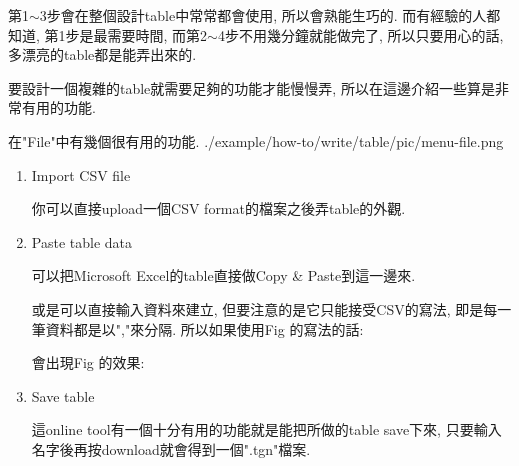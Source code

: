   第1$\sim$3步會在整個設計table中常常都會使用, 所以會熟能生巧的. 而有經驗的人都知道, 第1步是最需要時間, 而第2$\sim$4步不用幾分鐘就能做完了, 所以只要用心的話, 多漂亮的table都是能弄出來的.

\newpage
{}

要設計一個複雜的table就需要足夠的功能才能慢慢弄, 所以在這邊介紹一些算是非常有用的功能.


  在"File"中有幾個很有用的功能.
  \InsertFigure
    {./example/how-to/write/table/pic/menu-file.png}

  \begin{enumerate}

  \item
  {
    Import CSV file

    你可以直接upload一個CSV format的檔案之後弄table的外觀.
  } %

  \newpage
  \item
  {
    Paste table data

    可以把Microsoft Excel的table直接做Copy \& Paste到這一邊來.

    或是可以直接輸入資料來建立, 但要注意的是它只能接受CSV的寫法, 即是每一筆資料都是以","來分隔. 所以如果使用Fig 的寫法的話:

    會出現Fig 的效果:

  } %

  \newpage
  \item
  {
    Save table

    這online tool有一個十分有用的功能就是能把所做的table save下來, 只要輸入名字後再按download就會得到一個".tgn"檔案.

}
\end{enumerate}
